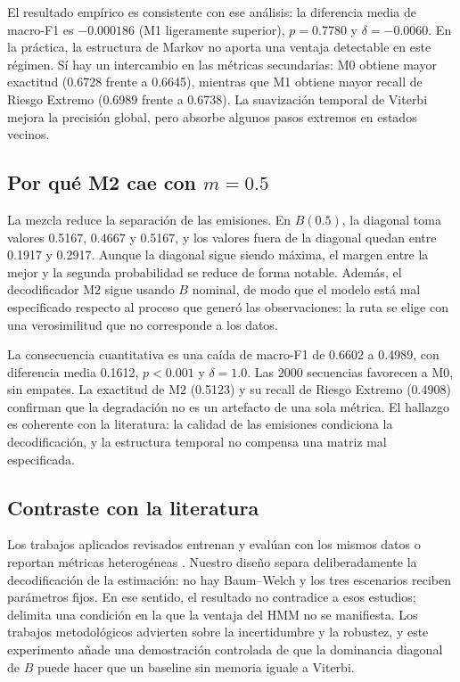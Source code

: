 \documentclass[11pt,letterpaper]{article}
\begin{document}
El resultado empírico es consistente con ese análisis: la diferencia media de macro-F1 es \(-0.000186\) (M1 ligeramente superior), \(p=0.7780\) y \(\delta=-0.0060\). En la práctica, la estructura de Markov no aporta una ventaja detectable en este régimen. Sí hay un intercambio en las métricas secundarias: M0 obtiene mayor exactitud (0.6728 frente a 0.6645), mientras que M1 obtiene mayor recall de Riesgo Extremo (0.6989 frente a 0.6738). La suavización temporal de Viterbi mejora la precisión global, pero absorbe algunos pasos extremos en estados vecinos.

\subsection{Por qué M2 cae con \(m=0.5\)}

La mezcla reduce la separación de las emisiones. En \(B(0.5)\), la diagonal toma valores 0.5167, 0.4667 y 0.5167, y los valores fuera de la diagonal quedan entre 0.1917 y 0.2917. Aunque la diagonal sigue siendo máxima, el margen entre la mejor y la segunda probabilidad se reduce de forma notable. Además, el decodificador M2 sigue usando \(B\) nominal, de modo que el modelo está mal especificado respecto al proceso que generó las observaciones: la ruta se elige con una verosimilitud que no corresponde a los datos.

La consecuencia cuantitativa es una caída de macro-F1 de 0.6602 a 0.4989, con diferencia media 0.1612, \(p<0.001\) y \(\delta=1.0\). Las 2000 secuencias favorecen a M0, sin empates. La exactitud de M2 (0.5123) y su recall de Riesgo Extremo (0.4908) confirman que la degradación no es un artefacto de una sola métrica. El hallazgo es coherente con la literatura: la calidad de las emisiones condiciona la decodificación, y la estructura temporal no compensa una matriz mal especificada.

\subsection{Contraste con la literatura}

Los trabajos aplicados revisados entrenan y evalúan con los mismos datos o reportan métricas heterogéneas \cite{wanjala2025,grammenos2025,tran2026,li2013,wang2026}. Nuestro diseño separa deliberadamente la decodificación de la estimación: no hay Baum--Welch y los tres escenarios reciben parámetros fijos. En ese sentido, el resultado no contradice a esos estudios; delimita una condición en la que la ventaja del HMM no se manifiesta. Los trabajos metodológicos \cite{nicosia2026,pouzo2025} advierten sobre la incertidumbre y la robustez, y este experimento añade una demostración controlada de que la dominancia diagonal de \(B\) puede hacer que un baseline sin memoria iguale a Viterbi.
\end{document}
